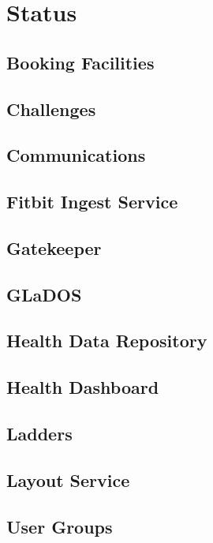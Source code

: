 \chapter{Status}

\section{Booking Facilities}
    

\section{Challenges}
    

\section{Communications}
    

\section{Fitbit Ingest Service}


\section{Gatekeeper}
    

\section{GLaDOS}
    

\section{Health Data Repository}
    

\section{Health Dashboard}
    

\section{Ladders}
    

\section{Layout Service}
    

\section{User Groups}
    